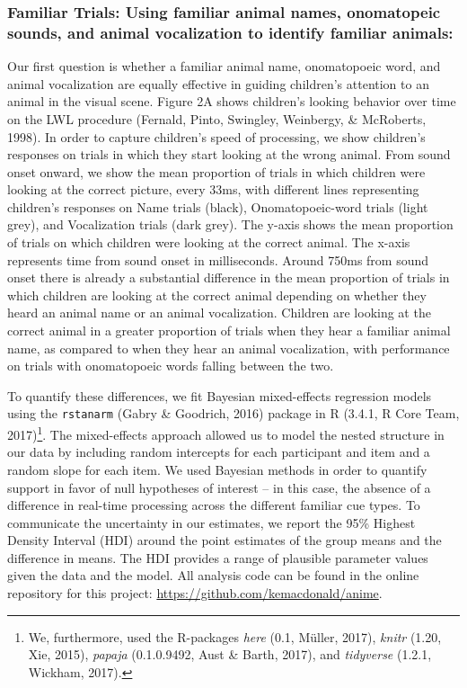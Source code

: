 \documentclass[english,floatsintext,man]{apa6}
\theoremstyle{definition}
\theoremstyle{definition}
\theoremstyle{definition}
\theoremstyle{remark}
\begin{document}
\hypertarget{familiar-trials-using-familiar-animal-names-onomatopeic-sounds-and-animal-vocalization-to-identify-familiar-animals}{%
\subsubsection{Familiar Trials: Using familiar animal names, onomatopeic
sounds, and animal vocalization to identify familiar
animals:}\label{familiar-trials-using-familiar-animal-names-onomatopeic-sounds-and-animal-vocalization-to-identify-familiar-animals}}

Our first question is whether a familiar animal name, onomatopoeic word,
and animal vocalization are equally effective in guiding children's
attention to an animal in the visual scene. Figure 2A shows children's
looking behavior over time on the LWL procedure (Fernald, Pinto,
Swingley, Weinbergy, \& McRoberts, 1998). In order to capture children's
speed of processing, we show children's responses on trials in which
they start looking at the wrong animal. From sound onset onward, we show
the mean proportion of trials in which children were looking at the
correct picture, every 33ms, with different lines representing
children's responses on Name trials (black), Onomatopoeic-word trials
(light grey), and Vocalization trials (dark grey). The y-axis shows the
mean proportion of trials on which children were looking at the correct
animal. The x-axis represents time from sound onset in milliseconds.
Around 750ms from sound onset there is already a substantial difference
in the mean proportion of trials in which children are looking at the
correct animal depending on whether they heard an animal name or an
animal vocalization. Children are looking at the correct animal in a
greater proportion of trials when they hear a familiar animal name, as
compared to when they hear an animal vocalization, with performance on
trials with onomatopoeic words falling between the two.

To quantify these differences, we fit Bayesian mixed-effects regression
models using the \texttt{rstanarm} (Gabry \& Goodrich, 2016) package in
R (3.4.1, R Core Team, 2017)\footnote{We, furthermore, used the
  R-packages \emph{here} (0.1, Müller, 2017), \emph{knitr} (1.20, Xie,
  2015), \emph{papaja} (0.1.0.9492, Aust \& Barth, 2017), and
  \emph{tidyverse} (1.2.1, Wickham, 2017).}. The mixed-effects approach
allowed us to model the nested structure in our data by including random
intercepts for each participant and item and a random slope for each
item. We used Bayesian methods in order to quantify support in favor of
null hypotheses of interest -- in this case, the absence of a difference
in real-time processing across the different familiar cue types. To
communicate the uncertainty in our estimates, we report the 95\% Highest
Density Interval (HDI) around the point estimates of the group means and
the difference in means. The HDI provides a range of plausible parameter
values given the data and the model. All analysis code can be found in
the online repository for this project:
\url{https://github.com/kemacdonald/anime}.
\end{document}
